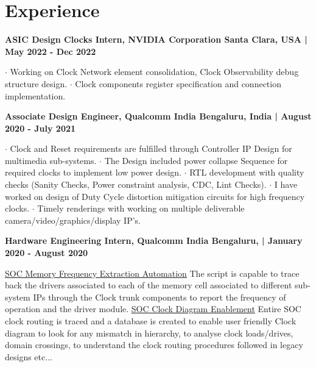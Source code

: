 \documentclass[letterpaper,11pt]{article}
\begin{document}
\section{Experience}
    \textbf{ASIC Design Clocks Intern, NVIDIA Corporation \hspace{\fill} Santa Clara, USA | May 2022 - Dec 2022} \\
    \vspace{-8 pt}
    \begin{justify}
    $\cdot$ Working on Clock Network element consolidation, Clock Observability debug structure design. \newline $\cdot$ Clock components register specification and connection implementation.
    \end{justify}
    \vspace{-3 pt}
    
    \textbf{Associate Design Engineer, Qualcomm India \hspace{\fill} Bengaluru, India | August 2020 - July 2021} \\
    \vspace{-8 pt}
    \begin{justify}
    $\cdot$ Clock and Reset requirements are fulfilled through Controller IP Design for multimedia sub-systems. \newline $\cdot$ The Design included power collapse Sequence for required clocks to implement low power design. \newline $\cdot$ RTL development with quality checks (Sanity Checks, Power constraint analysis, CDC, Lint Checks). \newline $\cdot$ I have worked on design of Duty Cycle distortion mitigation circuits for high frequency clocks. \newline $\cdot$ Timely renderings with working on multiple deliverable camera/video/graphics/display IP's.  
    \end{justify}
    
    \textbf{Hardware Engineering Intern, Qualcomm India \hspace{\fill} Bengaluru, | January 2020 - August 2020} \\
    \vspace{-8 pt}
    \begin{justify}
    \underline{SOC Memory Frequency Extraction Automation} The script is capable to trace back the drivers associated to each of the memory cell associated to different sub-system IPs through the Clock trunk components to report the frequency of operation and the driver module. \newline \underline{SOC Clock Diagram Enablement} Entire SOC clock routing is traced and a database is created to enable user friendly Clock diagram to look for any mismatch in hierarchy, to analyse clock loads/drives, domain crossings, to understand the clock routing procedures followed in legacy designs etc...
    \end{justify}
    \vspace{-3 pt}
    
\end{document}
